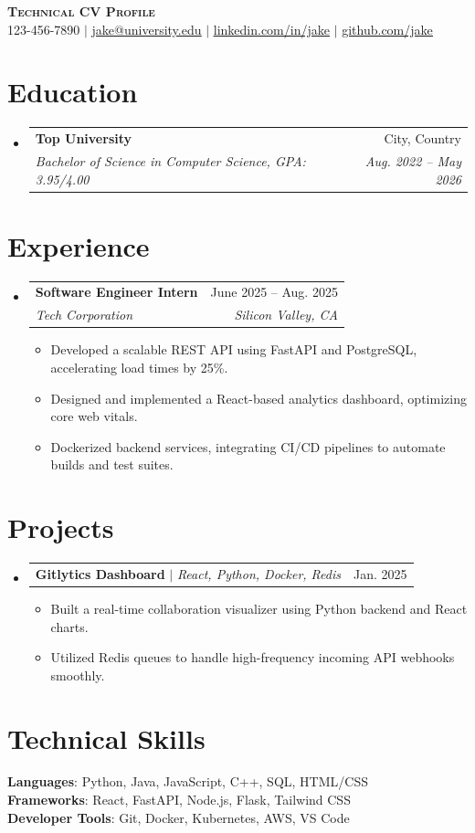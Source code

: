 \documentclass[letterpaper,11pt]{article}
\makeatletter
\newcommand{\resumeItem}[1]{
  \item\small{
    {#1 \vspace{-2pt}}
  }
}
\newcommand{\resumeSubheading}[4]{
  \vspace{-2pt}\item
    \begin{tabular*}{0.97\textwidth}[t]{l@{\extracolsep{\fill}}r}
      \textbf{#1} & #2 \\
      \textit{\small#3} & \textit{\small #4} \\
    \end{tabular*}\vspace{-7pt}
}
\newcommand{\resumeProjectHeading}[2]{
    \item
    \begin{tabular*}{0.97\textwidth}{l@{\extracolsep{\fill}}r}
      \small#1 & #2 \\
    \end{tabular*}\vspace{-7pt}
}
\newcommand{\resumeSubHeadingListStart}{\begin{itemize}[leftmargin=0.15in, label={}]}
\newcommand{\resumeSubHeadingListEnd}{\end{itemize}}
\newcommand{\resumeItemListStart}{\begin{itemize}}
\newcommand{\resumeItemListEnd}{\end{itemize}\vspace{-5pt}}
\makeatother
\begin{document}
\begin{center}
    \textbf{\Huge \scshape Technical CV Profile} \\ \vspace{1pt}
    \small 123-456-7890 $|$ \href{mailto:jake@university.edu}{\underline{jake@university.edu}} $|$ 
    \href{https://linkedin.com}{\underline{linkedin.com/in/jake}} $|$
    \href{https://github.com}{\underline{github.com/jake}}
\end{center}

\section{Education}
  \resumeSubHeadingListStart
    \resumeSubheading
      {Top University}{City, Country}
      {Bachelor of Science in Computer Science, GPA: 3.95/4.00}{Aug. 2022 -- May 2026}
  \resumeSubHeadingListEnd

\section{Experience}
  \resumeSubHeadingListStart
    \resumeSubheading
      {Software Engineer Intern}{June 2025 -- Aug. 2025}
      {Tech Corporation}{Silicon Valley, CA}
      \resumeItemListStart
        \resumeItem{Developed a scalable REST API using FastAPI and PostgreSQL, accelerating load times by 25\%.}
        \resumeItem{Designed and implemented a React-based analytics dashboard, optimizing core web vitals.}
        \resumeItem{Dockerized backend services, integrating CI/CD pipelines to automate builds and test suites.}
      \resumeItemListEnd
  \resumeSubHeadingListEnd

\section{Projects}
  \resumeSubHeadingListStart
    \resumeProjectHeading
      {\textbf{Gitlytics Dashboard} $|$ \emph{React, Python, Docker, Redis}}{Jan. 2025}
      \resumeItemListStart
        \resumeItem{Built a real-time collaboration visualizer using Python backend and React charts.}
        \resumeItem{Utilized Redis queues to handle high-frequency incoming API webhooks smoothly.}
      \resumeItemListEnd
  \resumeSubHeadingListEnd

\section{Technical Skills}
 \begin{itemize}[leftmargin=0.15in, label={}]
    \small{\item{
     \textbf{Languages}{: Python, Java, JavaScript, C++, SQL, HTML/CSS} \\
     \textbf{Frameworks}{: React, FastAPI, Node.js, Flask, Tailwind CSS} \\
     \textbf{Developer Tools}{: Git, Docker, Kubernetes, AWS, VS Code}
    }}
 \end{itemize}
\end{document}
